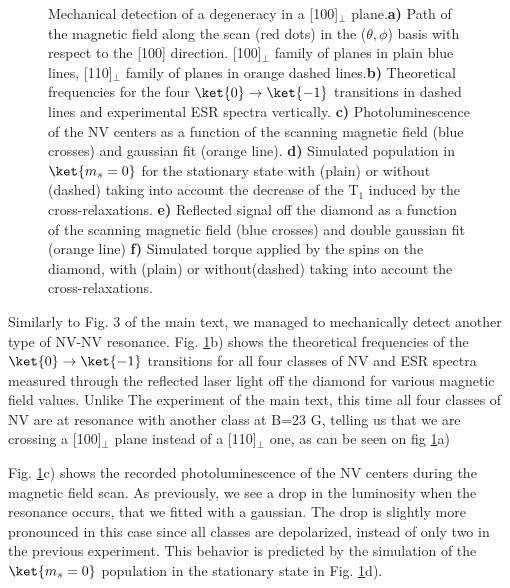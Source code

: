 \documentclass[preprintnumbers,amsmath,amssymb,onecolumn,12pt]{revtex4}
\begin{document}
\begin{figure}[!ht]
  \centering {}
  \caption{Mechanical detection of a degeneracy in a [100]$_\perp$ plane.\textbf{a)} Path of the magnetic field along the scan (red dots) in the ($\theta , \phi$) basis with respect to the [100] direction. [100]$_\perp$ family of planes in plain blue lines, [110]$_\perp$ family of planes in orange dashed lines.\textbf{b)} Theoretical frequencies for the four $\ket{0} \to \ket{-1}$ transitions in dashed lines and experimental ESR spectra vertically. \textbf{c)} Photoluminescence of the NV centers as a function of the scanning magnetic field (blue crosses) and gaussian fit (orange line). \textbf{d)} Simulated population in $\ket{m_s=0}$ for the stationary state with (plain) or without (dashed) taking into account the decrease of the T$_1$ induced by the cross-relaxations.
  \textbf{e)} Reflected signal off the diamond as a function of the scanning magnetic field (blue crosses) and double gaussian fit (orange line) \textbf{f)} Simulated torque applied by the spins on the diamond, with (plain) or without(dashed) taking into account the cross-relaxations.}

	\label{CR_22}
\end{figure}

Similarly to Fig. 3 of the main text, we managed to mechanically detect another type of NV-NV resonance. Fig. \ref{CR_22}b) shows the theoretical frequencies of the $\ket{0} \to \ket{-1}$ transitions for all four classes of NV and ESR spectra measured through the reflected laser light off the diamond for various magnetic field values. Unlike The experiment of the main text, this time all four classes of NV are at resonance with another class at B=23 G, telling us that we are crossing a [100]$_\perp$ plane instead of a [110]$_\perp$ one, as can be seen on fig \ref{CR_22}a)

Fig. \ref{CR_22}c) shows the recorded photoluminescence of the NV centers during the magnetic field scan. As previously, we see a drop in the luminosity when the resonance occurs, that we fitted with a gaussian. The drop is slightly more pronounced in this case since all classes are depolarized, instead of only two in the previous experiment. This behavior is predicted by the simulation of the $\ket{m_s=0}$ population in the stationary state in Fig. \ref{CR_22}d).
\end{document}
